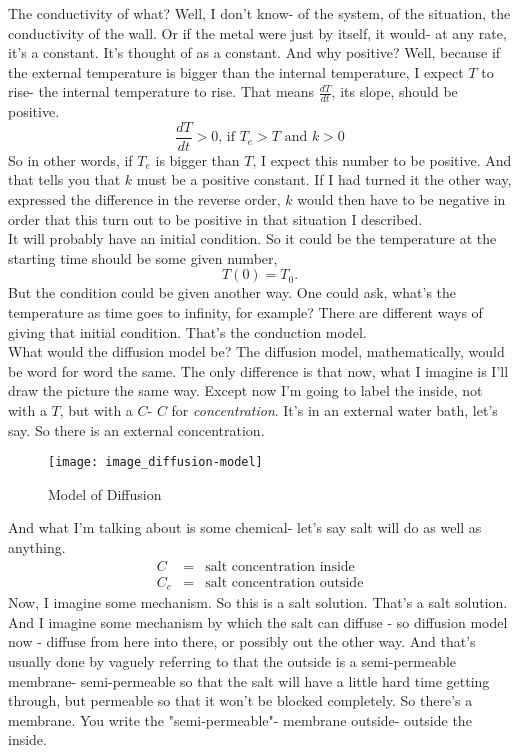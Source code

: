 The conductivity of what?
Well, I don't know- of the system, of the situation, the conductivity of the wall.
Or if the metal were just by itself, it would- at any rate, it's a constant.
It's thought of as a constant. And why positive?
Well, because if the external temperature is bigger than the internal temperature,
I expect $T$ to rise- the internal temperature to rise. That means $\frac{dT}{dt}$,
its slope, should be positive.
\begin{equation*}
  \frac{dT}{dt} > 0 \text{,  if } T_e > T \text{ and } k > 0
\end{equation*}
So in other words, if $T_e$ is bigger than $T$,
I expect this number to be positive. And that tells you that $k$ must be a positive constant.
If I had turned it the other way, expressed the difference in the reverse order, $k$ would then have to be negative in order that this turn out to be positive in that situation I described.\\

It will probably have an initial condition.
So it could be the temperature at the starting time should be some given number,
\begin{equation*}
  T(0) = T_0. 
\end{equation*}
But the condition could be given another way.
One could ask, what's the temperature as time goes to infinity, for example?
There are different ways of giving that initial condition.
That's the conduction model.\\

What would the diffusion model be?
The diffusion model, mathematically, would be word for word the same.
The only difference is that now, what I imagine is I'll draw the picture the same way.
Except now I'm going to label the inside, not with a $T$, but with a $C$- $C$ for \textit{concentration}.
It's in an external water bath, let's say.
So there is an external concentration.
\begin{figure}[ht!]
  \centering
  \texttt{[image: image\_diffusion-model]}
  \caption{Model of Diffusion}
\end{figure}

And what I'm talking about is some chemical- let's say salt will do as well as anything.
\begin{eqnarray*}
  C &=& \text{salt concentration inside} \\
  C_e &=& \text{salt concentration outside}
\end{eqnarray*}
Now, I imagine some mechanism. So this is a salt solution.
That's a salt solution.
And I imagine some mechanism by which the salt can diffuse - so diffusion model now - diffuse from here into there, or possibly out the other way.
And that's usually done by vaguely referring to that the outside is a semi-permeable membrane- semi-permeable so that the salt will have a little hard time getting through, but permeable so that it won't be blocked completely.
So there's a membrane. You write the "semi-permeable"- membrane outside- outside the inside.\\
\clearpage

